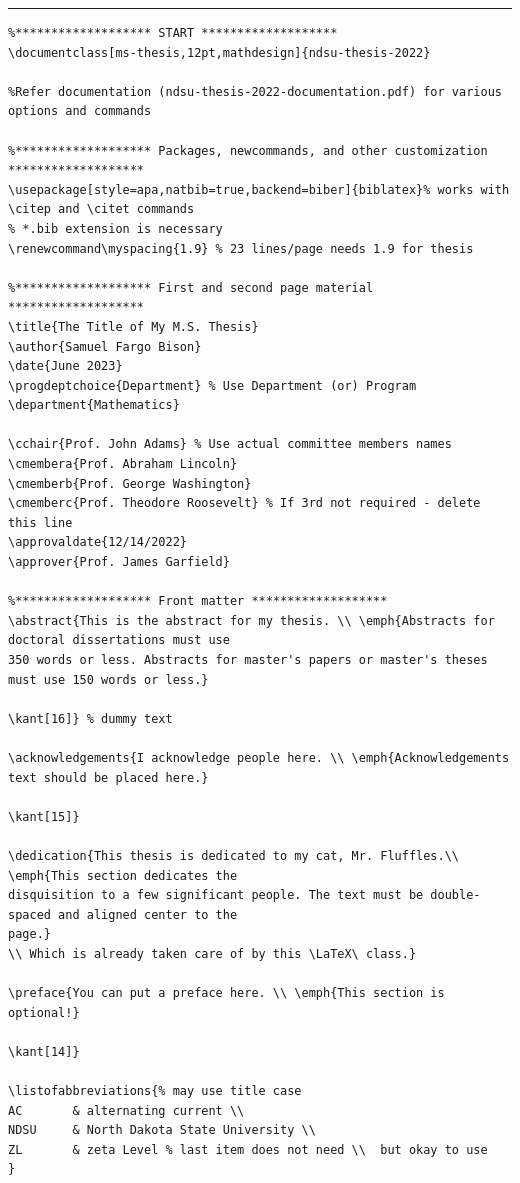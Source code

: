 \documentclass[letterpaper]{refart}
\begin{document}
\vspace{6mm}
\hrule
{\scriptsize
\begin{verbatim}
%******************* START *******************
\documentclass[ms-thesis,12pt,mathdesign]{ndsu-thesis-2022}

%Refer documentation (ndsu-thesis-2022-documentation.pdf) for various options and commands

%******************* Packages, newcommands, and other customization *******************
\usepackage[style=apa,natbib=true,backend=biber]{biblatex}% works with \citep and \citet commands
% *.bib extension is necessary 
\renewcommand\myspacing{1.9} % 23 lines/page needs 1.9 for thesis

%******************* First and second page material *******************
\title{The Title of My M.S. Thesis}
\author{Samuel Fargo Bison}
\date{June 2023}
\progdeptchoice{Department} % Use Department (or) Program
\department{Mathematics}

\cchair{Prof. John Adams} % Use actual committee members names 
\cmembera{Prof. Abraham Lincoln}
\cmemberb{Prof. George Washington}
\cmemberc{Prof. Theodore Roosevelt} % If 3rd not required - delete this line 
\approvaldate{12/14/2022}
\approver{Prof. James Garfield}

%******************* Front matter *******************
\abstract{This is the abstract for my thesis. \\ \emph{Abstracts for doctoral dissertations must use 
350 words or less. Abstracts for master's papers or master's theses must use 150 words or less.}

\kant[16]} % dummy text

\acknowledgements{I acknowledge people here. \\ \emph{Acknowledgements text should be placed here.} 

\kant[15]}

\dedication{This thesis is dedicated to my cat, Mr. Fluffles.\\ \emph{This section dedicates the 
disquisition to a few significant people. The text must be double-spaced and aligned center to the 
page.} 
\\ Which is already taken care of by this \LaTeX\ class.}

\preface{You can put a preface here. \\ \emph{This section is optional!} 

\kant[14]}

\listofabbreviations{% may use title case
AC       & alternating current \\
NDSU     & North Dakota State University \\
ZL       & zeta Level % last item does not need \\  but okay to use
}


\end{verbatim}}
\end{document}
